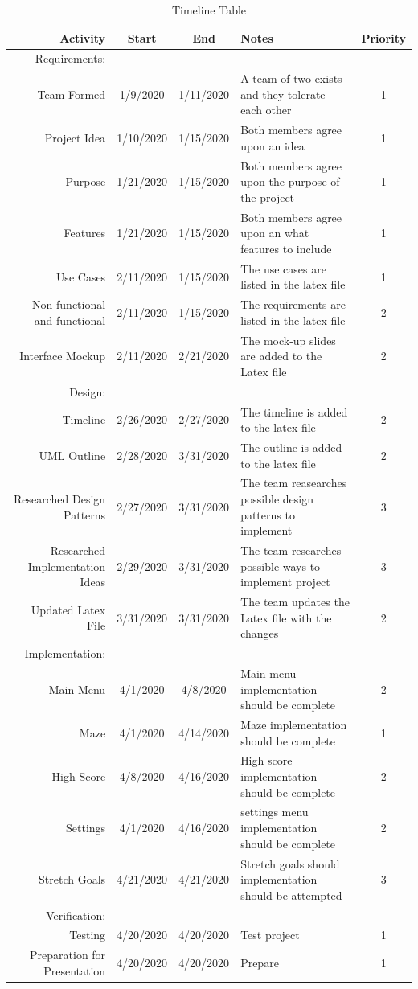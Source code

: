 \documentclass[10pt,conference,onecolumn,compsoc]{IEEEtran}
\begin{document}
\begin{table}
\centering
\begin{tabular}{|r|c|c|l|c|}
\hline
 Activity & Start & End & Notes & Priority \\
\hline \hline
Requirements: \\
\hline \hline

Team Formed & 1/9/2020 & 1/11/2020 & A team of two exists and they tolerate each other & 1\\
Project Idea & 1/10/2020 & 1/15/2020 & Both members agree upon an idea & 1\\
Purpose & 1/21/2020 & 1/15/2020 & Both members agree upon the purpose of the project & 1\\
Features & 1/21/2020 & 1/15/2020 & Both members agree upon an what features to include& 1\\
Use Cases & 2/11/2020 & 1/15/2020 & The use cases are listed in the latex file & 1\\
Non-functional and functional & 2/11/2020 & 1/15/2020 & The requirements are listed in the latex file & 2\\
Interface Mockup & 2/11/2020 & 2/21/2020 & The mock-up slides are added to the Latex file & 2\\
\hline \hline
Design: \\
\hline \hline 
Timeline & 2/26/2020 & 2/27/2020 & The timeline is added to the latex file & 2\\
UML Outline & 2/28/2020 & 3/31/2020 & The outline is added to the latex file & 2\\
Researched Design Patterns& 2/27/2020& 3/31/2020 & The team reasearches possible design patterns to implement & 3\\
Researched Implementation Ideas & 2/29/2020& 3/31/2020 & The team researches possible ways to implement project & 3\\
Updated Latex File& 3/31/2020 & 3/31/2020 & The team updates the Latex file with the changes&2\\
\hline \hline
Implementation: \\
\hline \hline 
Main Menu &4/1/2020& 4/8/2020& Main menu implementation should be complete& 2\\
Maze&4/1/2020 & 4/14/2020 & Maze implementation should be complete& 1\\
High Score& 4/8/2020&4/16/2020& High score implementation should be complete& 2\\
Settings&4/1/2020& 4/16/2020& settings menu implementation should be complete& 2\\
Stretch Goals& 4/21/2020&4/21/2020& Stretch goals should implementation should be attempted & 3\\
\hline \hline
Verification: \\
\hline \hline 
Testing & 4/20/2020&4/20/2020&Test project&1\\
Preparation for Presentation & 4/20/2020&4/20/2020& Prepare&1\\
\hline
\end{tabular}
\caption{Timeline Table}
\label{tab:timeline}
\end{table}
\clearpage
\end{document}
